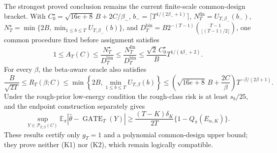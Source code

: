 The strongest proved conclusion remains the current finite-scale common-design bracket. With \(C_0^\star=\sqrt{16e+8}\,B+2C/\beta_-\), \(b_-=\lceil T^{1/(2\beta_-+1)}\rceil\), \(N_T^{\mathrm{fin}}=U_{T,\beta_-}(b_-)\), \(N_T^\star=\min\{2B,\min_{1\le b\le T}U_{T,\beta_-}(b)\}\), and \(D_T^{\mathrm{bin}}=B2^{-(T-1)}\binom{T-1}{\lfloor(T-1)/2\rfloor}\), one common procedure fixed before assignment satisfies \[1\le A_T(C)\le\frac{N_T^\star}{D_T^{\mathrm{bin}}}\le\frac{N_T^{\mathrm{fin}}}{D_T^{\mathrm{bin}}}\le\frac{\sqrt2\,C_0^\star}{B}T^{1/(4\beta_-+2)}.\] For every \(\beta\), the beta-aware oracle also satisfies \[\frac{B}{\sqrt{2T}}\le R_T(\beta;C)\le\min\left\{2B,\min_{1\le b\le T}U_{T,\beta}(b)\right\}\le\left(\sqrt{16e+8}\,B+\frac{2C}{\beta}\right)T^{-\beta/(2\beta+1)}.\] Under the rough-prior low-energy condition the rough-class risk is at least \(s_b/25\), and the endpoint construction separately gives \[\sup_{Y\in\mathcal P_{T,\beta}(C)}\mathbb E_\pi\left|\widehat\theta-\operatorname{GATE}_T(Y)\right|\ge\frac{(T-K)\delta_K}{2T}\{1-Q_\pi(E_{\alpha,K})\}.\] These results certify only \(g_T=1\) and a polynomial common-design upper bound; they prove neither (K1) nor (K2), which remain logically compatible.